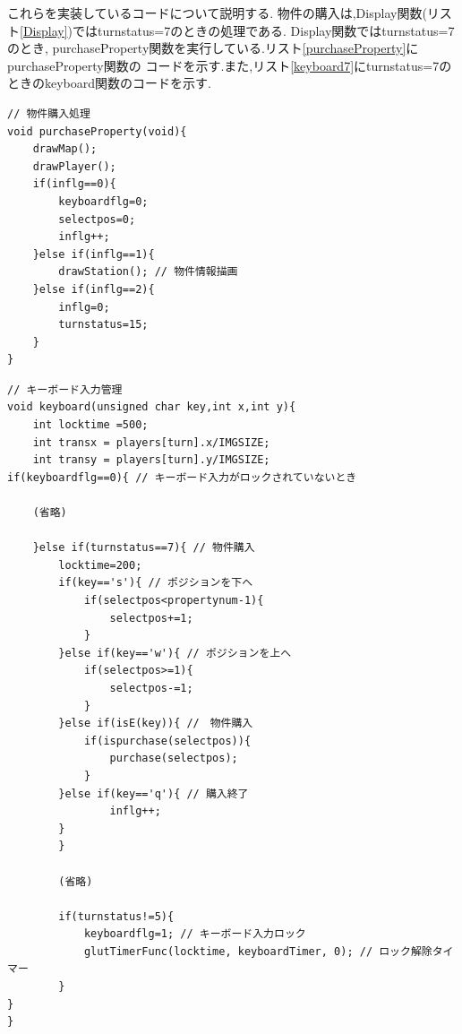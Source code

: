 \documentclass[a4j]{jarticle}
\begin{document}
    これらを実装しているコードについて説明する. 物件の購入は,Display関数(リスト\ref{Display})ではturnstatus=7のときの処理である.
    Display関数ではturnstatus=7のとき, purchaseProperty関数を実行している.リスト\ref{purchaseProperty}にpurchaseProperty関数の
    コードを示す.また,リスト\ref{keyboard7}にturnstatus=7のときのkeyboard関数のコードを示す.\\

    \begin{lstlisting}[basicstyle=\ttfamily\footnotesize, frame=single,label=purchaseProperty,caption=purchaseProperty関数]
// 物件購入処理
void purchaseProperty(void){
    drawMap();
    drawPlayer(); 
    if(inflg==0){
        keyboardflg=0;
        selectpos=0;
        inflg++;
    }else if(inflg==1){
        drawStation(); // 物件情報描画
    }else if(inflg==2){
        inflg=0;
        turnstatus=15;
    }
}
    \end{lstlisting} 

    \begin{lstlisting}[basicstyle=\ttfamily\footnotesize, frame=single,label=keyboard7,caption=物件購入時のキーボード入力の処理]
// キーボード入力管理
void keyboard(unsigned char key,int x,int y){
    int locktime =500;
    int transx = players[turn].x/IMGSIZE;
    int transy = players[turn].y/IMGSIZE;
if(keyboardflg==0){ // キーボード入力がロックされていないとき
    
    (省略)

    }else if(turnstatus==7){ // 物件購入
        locktime=200;
        if(key=='s'){ // ポジションを下へ
            if(selectpos<propertynum-1){
                selectpos+=1;
            }            
        }else if(key=='w'){ // ポジションを上へ
            if(selectpos>=1){
                selectpos-=1;
            }            
        }else if(isE(key)){ //　物件購入
            if(ispurchase(selectpos)){
                purchase(selectpos);
            }
        }else if(key=='q'){ // 購入終了
                inflg++;
        }
        }

        (省略)

        if(turnstatus!=5){
            keyboardflg=1; // キーボード入力ロック
            glutTimerFunc(locktime, keyboardTimer, 0); // ロック解除タイマー
        }
}
}
    \end{lstlisting} 
\end{document}
